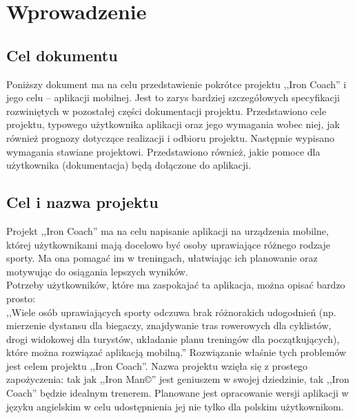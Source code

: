 

\tableofcontents
\clearpage
\section{Wprowadzenie}
\subsection{Cel dokumentu}
\noindent Poniższy dokument ma na celu przedstawienie pokrótce projektu ,,Iron Coach'' i jego celu -- aplikacji mobilnej. Jest to zarys bardziej szczegółowych specyfikacji rozwiniętych w pozostałej części dokumentacji projektu. Przedstawiono cele projektu, typowego użytkownika aplikacji oraz jego wymagania wobec niej, jak również prognozy dotyczące realizacji i odbioru projektu. Następnie wypisano wymagania stawiane projektowi. Przedstawiono również, jakie pomoce dla użytkownika (dokumentacja) będą dołączone do aplikacji.
\subsection{Cel i nazwa projektu}
\noindent Projekt ,,Iron Coach'' ma na celu napisanie aplikacji na urządzenia mobilne, której użytkownikami mają docelowo być osoby uprawiające różnego rodzaje sporty. Ma ona pomagać im w treningach, ułatwiając ich planowanie oraz motywując do osiągania lepszych wyników. \\
Potrzeby użytkowników, które ma zaspokajać ta aplikacja, można opisać bardzo prosto:\\ 
\indent ,,Wiele osób uprawiających sporty odczuwa brak różnorakich udogodnień (np. mierzenie dystansu dla biegaczy, znajdywanie tras rowerowych dla cyklistów, drogi widokowej dla turystów, układanie planu treningów dla początkujących), które można rozwiązać aplikacją mobilną.''\cite{Ba}
Rozwiązanie właśnie tych problemów jest celem projektu ,,Iron Coach''. 
Nazwa projektu wzięła się z prostego zapożyczenia: tak jak ,,Iron Man©'' jest geniuszem w swojej dziedzinie, tak ,,Iron Coach'' będzie idealnym trenerem. Planowane jest opracowanie wersji aplikacji w języku angielskim w celu udostępnienia jej nie tylko dla polskim użytkownikom.
